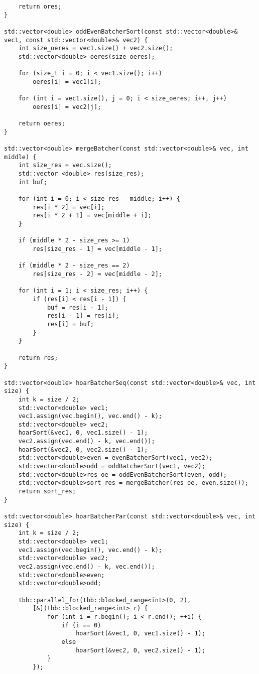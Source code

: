 \documentclass{report}
\begin{document}
\begin{lstlisting}
    return ores;
}

std::vector<double> oddEvenBatcherSort(const std::vector<double>& vec1, const std::vector<double>& vec2) {
    int size_oeres = vec1.size() + vec2.size();
    std::vector<double> oeres(size_oeres);

    for (size_t i = 0; i < vec1.size(); i++)
        oeres[i] = vec1[i];

    for (int i = vec1.size(), j = 0; i < size_oeres; i++, j++)
        oeres[i] = vec2[j];

    return oeres;
}

std::vector<double> mergeBatcher(const std::vector<double>& vec, int middle) {
    int size_res = vec.size();
    std::vector <double> res(size_res);
    int buf;

    for (int i = 0; i < size_res - middle; i++) {
        res[i * 2] = vec[i];
        res[i * 2 + 1] = vec[middle + i];
    }

    if (middle * 2 - size_res >= 1)
        res[size_res - 1] = vec[middle - 1];

    if (middle * 2 - size_res == 2)
        res[size_res - 2] = vec[middle - 2];

    for (int i = 1; i < size_res; i++) {
        if (res[i] < res[i - 1]) {
            buf = res[i - 1];
            res[i - 1] = res[i];
            res[i] = buf;
        }
    }

    return res;
}

std::vector<double> hoarBatcherSeq(const std::vector<double>& vec, int size) {
    int k = size / 2;
    std::vector<double> vec1;
    vec1.assign(vec.begin(), vec.end() - k);
    std::vector<double> vec2;
    hoarSort(&vec1, 0, vec1.size() - 1);
    vec2.assign(vec.end() - k, vec.end());
    hoarSort(&vec2, 0, vec2.size() - 1);
    std::vector<double>even = evenBatcherSort(vec1, vec2);
    std::vector<double>odd = oddBatcherSort(vec1, vec2);
    std::vector<double>res_oe = oddEvenBatcherSort(even, odd);
    std::vector<double>sort_res = mergeBatcher(res_oe, even.size());
    return sort_res;
}

std::vector<double> hoarBatcherPar(const std::vector<double>& vec, int size) {
    int k = size / 2;
    std::vector<double> vec1;
    vec1.assign(vec.begin(), vec.end() - k);
    std::vector<double> vec2;
    vec2.assign(vec.end() - k, vec.end());
    std::vector<double>even;
    std::vector<double>odd;

    tbb::parallel_for(tbb::blocked_range<int>(0, 2),
        [&](tbb::blocked_range<int> r) {
            for (int i = r.begin(); i < r.end(); ++i) {
                if (i == 0)
                    hoarSort(&vec1, 0, vec1.size() - 1);
                else
                    hoarSort(&vec2, 0, vec2.size() - 1);
            }
        });


\end{lstlisting}
\end{document}
